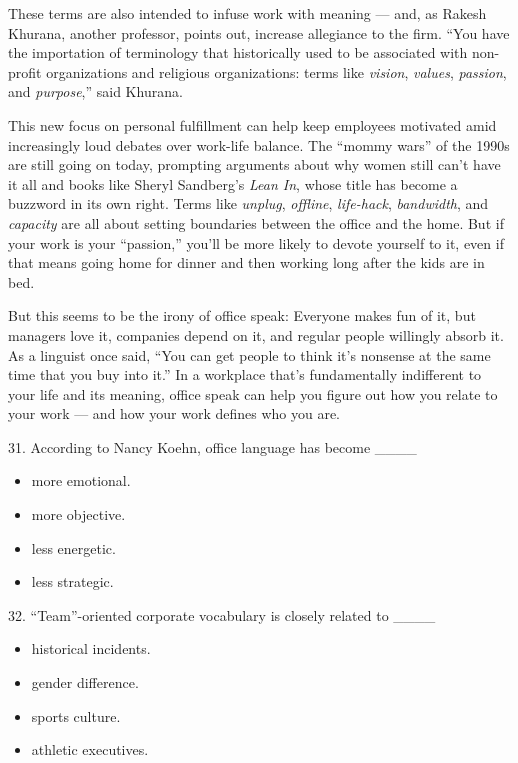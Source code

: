 \documentclass[UTF8,11pt]{ctexart}
\begin{document}
These terms are also intended to infuse work with meaning — and, as Rakesh Khurana, another professor, points out, increase allegiance to the firm. “You have the importation of terminology that historically used to be associated with non-profit organizations and religious organizations: terms like \textit{vision}, \textit{values}, \textit{passion}, and \textit{purpose},” said Khurana.


This new focus on personal fulfillment can help keep employees motivated amid increasingly loud debates over work-life balance. The “mommy wars” of the 1990s are still going on today, prompting arguments about why women still can’t have it all and books like Sheryl Sandberg’s \textit{Lean In}, whose title has become a buzzword in its own right. Terms like \textit{unplug}, \textit{offline}, \textit{life-hack}, \textit{bandwidth}, and \textit{capacity} are all about setting boundaries between the office and the home. But if your work is your “passion,” you’ll be more likely to devote yourself to it, even if that means going home for dinner and then working long after the kids are in bed.


But this seems to be the irony of office speak: Everyone makes fun of it, but managers love it, companies depend on it, and regular people willingly absorb it. As a linguist once said, “You can get people to think it’s nonsense at the same time that you buy into it.” In a workplace that’s fundamentally indifferent to your life and its meaning, office speak can help you figure out how you relate to your work — and how your work defines who you are.


31. According to Nancy Koehn, office language has become \_\_\_\_


\begin{itemize}[leftmargin=2em,itemsep=.2em,topsep=.4em]\item[A.] more emotional.
\item[B.] more objective.
\item[C.] less energetic.
\item[D.] less strategic.
\end{itemize}

32. “Team”-oriented corporate vocabulary is closely related to \_\_\_\_


\begin{itemize}[leftmargin=2em,itemsep=.2em,topsep=.4em]\item[A.] historical incidents.
\item[B.] gender difference.
\item[C.] sports culture.
\item[D.] athletic executives.
\end{itemize}
\end{document}

